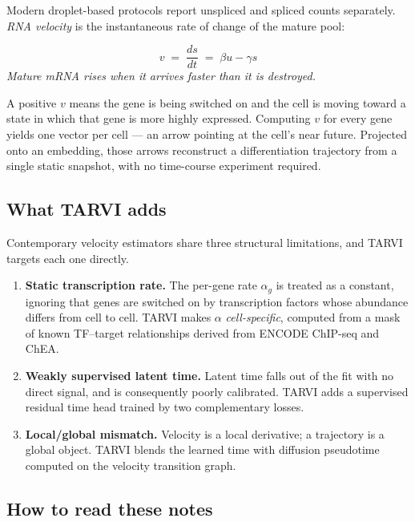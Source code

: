 \documentclass[11pt,a4paper]{article}
\newenvironment{keybox}{\begin{shaded}\noindent}{\end{shaded}}
\newcommand{\uns}{u}
\newcommand{\spl}{s}
\theoremstyle{definition}
\begin{document}
Modern droplet-based protocols report unspliced and spliced counts separately.
\emph{RNA velocity} is the instantaneous rate of change of the mature pool:
%
\begin{keybox}
\begin{equation}
v \;=\; \frac{d\spl}{dt} \;=\; \beta \uns - \gamma \spl
\label{eq:velocity}
\end{equation}
\emph{Mature mRNA rises when it arrives faster than it is destroyed.}
\end{keybox}
%
A positive $v$ means the gene is being switched on and the cell is moving
toward a state in which that gene is more highly expressed. Computing $v$ for
every gene yields one vector per cell --- an arrow pointing at the cell's near
future. Projected onto an embedding, those arrows reconstruct a
differentiation trajectory from a single static snapshot, with no time-course
experiment required.

\subsection{What TARVI adds}

Contemporary velocity estimators share three structural limitations, and
TARVI targets each one directly.

\begin{enumerate}[leftmargin=*]
\item \textbf{Static transcription rate.} The per-gene rate $\alpha_g$ is
      treated as a constant, ignoring that genes are switched on by
      transcription factors whose abundance differs from cell to cell. TARVI
      makes $\alpha$ \emph{cell-specific}, computed from a mask of known
      TF--target relationships derived from ENCODE ChIP-seq and ChEA.
\item \textbf{Weakly supervised latent time.} Latent time falls out of the fit
      with no direct signal, and is consequently poorly calibrated. TARVI adds
      a supervised residual time head trained by two complementary losses.
\item \textbf{Local/global mismatch.} Velocity is a local derivative;
      a trajectory is a global object. TARVI blends the learned time with
      diffusion pseudotime computed on the velocity transition graph.
\end{enumerate}

\subsection{How to read these notes}
\end{document}
